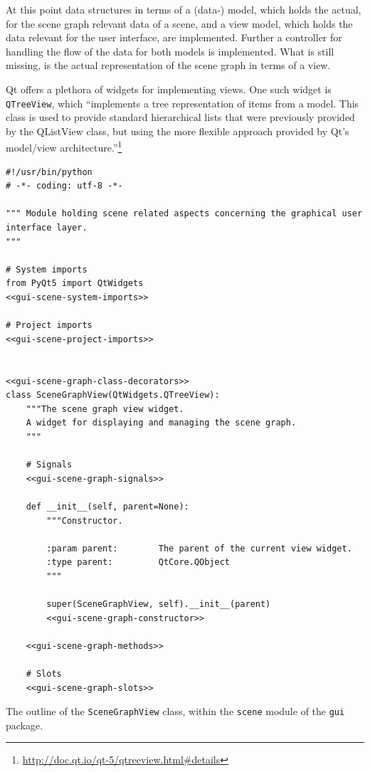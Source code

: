 \documentclass[10pt, openright, notitlepage]{scrreprt}
\begin{document}
At this point data structures in terms of a (data-) model, which holds the
actual, for the scene graph relevant data of a scene, and a view model, which
holds the data relevant for the user interface, are implemented. Further a
controller for handling the flow of the data for both models is implemented.
What is still missing, is the actual representation of the scene graph in terms
of a view.

Qt offers a plethora of widgets for implementing views. One such widget is
\texttt{QTreeView}, which ``implements a tree representation of items from a
model. This class is used to provide standard hierarchical lists that were
previously provided by the QListView class, but using the more flexible approach
provided by Qt's model/view
architecture.''\footnote{\url{http://doc.qt.io/qt-5/qtreeview.html\#details}}

\begin{listing}[H]
\begin{verbatim}
#!/usr/bin/python
# -*- coding: utf-8 -*-

""" Module holding scene related aspects concerning the graphical user interface layer.
"""

# System imports
from PyQt5 import QtWidgets
<<gui-scene-system-imports>>

# Project imports
<<gui-scene-project-imports>>


<<gui-scene-graph-class-decorators>>
class SceneGraphView(QtWidgets.QTreeView):
    """The scene graph view widget.
    A widget for displaying and managing the scene graph.
    """

    # Signals
    <<gui-scene-graph-signals>>

    def __init__(self, parent=None):
        """Constructor.

        :param parent:        The parent of the current view widget.
        :type parent:         QtCore.QObject
        """

        super(SceneGraphView, self).__init__(parent)
        <<gui-scene-graph-constructor>>

    <<gui-scene-graph-methods>>

    # Slots
    <<gui-scene-graph-slots>>
\end{verbatim}
\caption{\label{fig:gui-scene-graph}
The outline of the \texttt{SceneGraphView} class, within the \texttt{scene} module of the \texttt{gui} package.}
\end{listing}
\end{document}
